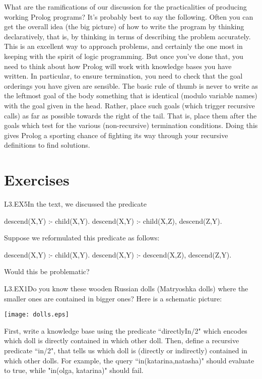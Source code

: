 What are the ramifications of our discussion for the practicalities of
producing working Prolog programs? It's probably best to say the following.
Often you can get the overall idea (the big picture) of how to write the
program by thinking declaratively, that is, by thinking in terms of describing
the problem accurately.  This is an excellent way to approach problems, and
certainly the one most in keeping with the spirit of logic programming.  But
once you've done that, you need to think about how Prolog will work with
knowledge bases you have written.  In particular, to ensure termination, you
need to check that the goal orderings you have given are sensible.  The basic
rule of thumb is never to write as the leftmost goal of the body something
that is identical (modulo variable names) with the goal given in the head.
Rather, place such goals (which trigger recursive calls) as far as possible
towards the right of the tail. That is, place them after the goals which test
for the various (non-recursive) termination conditions. Doing this gives
Prolog a sporting chance of fighting its way through your recursive
definitions to find solutions.


\clearpage
\section{Exercises}\label{SEC.L3.EXERCISES}


\begin{LPNexercise}{L3.EX5}In the text, we discussed the predicate
\begin{LPNcodedisplay}
descend(X,Y) :- child(X,Y).
descend(X,Y) :- child(X,Z),
                 descend(Z,Y).
\end{LPNcodedisplay}
Suppose we reformulated this predicate as follows:
\begin{LPNcodedisplay}
descend(X,Y) :- child(X,Y).
descend(X,Y) :- descend(X,Z),
                 descend(Z,Y).
\end{LPNcodedisplay}
\end{LPNexercise}
Would this
be problematic?

\begin{LPNexercise}{L3.EX1}Do you know these wooden Russian dolls
(Matryoshka dolls) where the smaller ones are contained in bigger
ones?  Here is a schematic picture:

\texttt{[image: dolls.eps]}

First, write a knowledge base using the predicate ``directlyIn/2" which
encodes which doll is directly contained in which other doll.  Then,
define a recursive predicate ``in/2", that tells us which doll is
(directly or indirectly) contained in which other dolls. For example,
the query ``in(katarina,natasha)" should evaluate to true, while
"in(olga, katarina)" should fail.
\end{LPNexercise}


